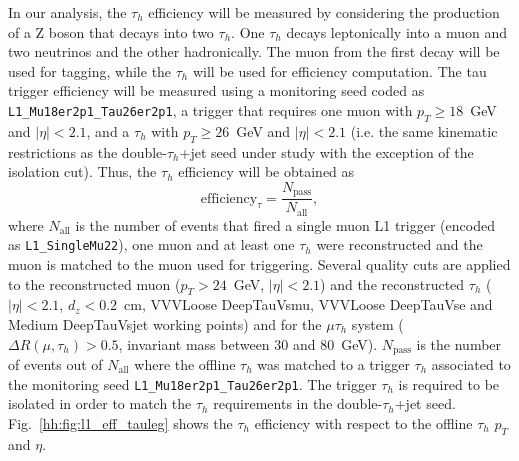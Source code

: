 \documentclass[../main.tex]{subfiles}
\begin{document}
In our analysis, the $\tau_h$ efficiency will be measured by considering the production of a Z boson that decays into two $\tau_h$. One $\tau_h$ decays leptonically into a muon and two neutrinos and the other hadronically. The muon from the first decay will be used for tagging, while the $\tau_h$ will be used for efficiency computation. The tau trigger efficiency will be measured using a monitoring seed coded as \texttt{L1\_Mu18er2p1\_Tau26er2p1}, a trigger that requires one muon with $p_T\geq18$~GeV and $|\eta|<2.1$, and a $\tau_h$ with $p_T\geq26$~GeV and $|\eta|<2.1$ (i.e. the same kinematic restrictions as the double-$\tau_h$+jet seed under study with the exception of the isolation cut). Thus, the $\tau_h$ efficiency will be obtained as
\begin{equation}
\text{efficiency}_{\tau} = \frac{N_\text{pass}}{N_\text{all}},
\end{equation}
where $N_\text{all}$ is the number of events that fired a single muon L1 trigger (encoded as \texttt{L1\_SingleMu22}), one muon and at least one $\tau_h$ were reconstructed and the muon is matched to the muon used for triggering. Several quality cuts are applied to the reconstructed muon ($p_T>24$~GeV, $|\eta|<2.1$) and the reconstructed $\tau_h$ ($|\eta|<2.1$, $d_z<0.2$~cm, VVVLoose DeepTauVsmu, VVVLoose DeepTauVse and Medium DeepTauVsjet working points) and for the $\mu\tau_h$ system ($\Delta R(\mu, \tau_h) > 0.5$, invariant mass between 30 and 80~GeV). $N_\text{pass}$ is the number of events out of $N_\text{all}$ where the offline $\tau_h$ was matched to a trigger $\tau_h$ associated to the monitoring seed \texttt{L1\_Mu18er2p1\_Tau26er2p1}. The trigger $\tau_h$ is required to be isolated in order to match the $\tau_h$ requirements in the double-$\tau_h$+jet seed. Fig.~\ref{hh:fig:l1_eff_tauleg} shows the $\tau_h$ efficiency with respect to the offline $\tau_h$ $p_T$ and $\eta$.
\end{document}

